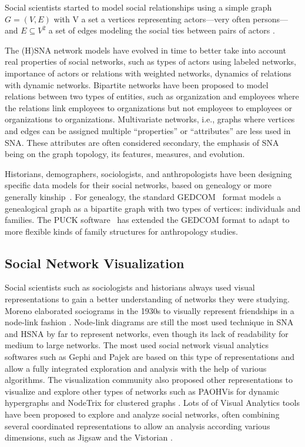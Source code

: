 \documentclass{vgtc}                          %
\begin{document}
Social scientists started to model social relationships using a simple graph $G= (V, E)$ with V a set a vertices representing actors---very often persons---and $E \subseteq V^2$ a set of edges modeling the social ties between pairs of actors \cite{freeman_development_2004}.

The (H)SNA network models have evolved in time to better take into account real properties of social networks, such as types of actors using labeled networks, importance of actors or relations with weighted networks, dynamics of relations with dynamic networks.
Bipartite networks have been proposed to model relations between two types of entities, such as organization and employees where the relations link employees to organizations but not employees to employees or organizations to organizations.
Multivariate networks, i.e.,  graphs where vertices and edges can be assigned multiple ``properties'' or ``attributes'' are less used in SNA\@. These attributes are often considered secondary, the emphasis of SNA being on the graph topology, its features, measures, and evolution.

Historians, demographers, sociologists, and anthropologists have been designing specific data models for their social networks, based on genealogy or more generally kinship~\cite{hamberger:halshs-00658667}. For genealogy, the standard GEDCOM~\cite{gedcom} format models a genealogical graph as a bipartite graph with two types of vertices: individuals and families. The PUCK software~\cite{PUCK} has extended the GEDCOM format to adapt to more flexible kinds of family structures for anthropology studies.

\subsection{Social Network Visualization}

Social scientists such as sociologists and historians always used visual representations to gain a better understanding of networks they were studying. Moreno elaborated sociograms in the 1930s to visually represent friendships in a node-link fashion \cite{moreno_foundations_1941}. Node-link diagrams are still the most used technique in SNA and HSNA by far to represent networks, even though its lack of readability for medium to large networks. The most used social network visual analytics softwares such as Gephi \cite{Gephi} and Pajek \cite{batagelj_pajek_nodate} are based on this type of representations and allow a fully integrated exploration and analysis with the help of various algorithms.
The visualization community also proposed other representations to visualize and explore other types of networks such as PAOHVis \cite{valdivia_analyzing_2021} for dynamic hypergraphs and NodeTrix for clustered graphs \cite{henry2007nodetrix}.
Lots of of Visual Analytics tools have been proposed to explore and analyze social networks, often combining several coordinated representations to allow an analysis according various dimensions, such as Jigsaw \cite{Stasko} and the Vistorian \cite{bach_networkcube_nodate}. 
\end{document}
